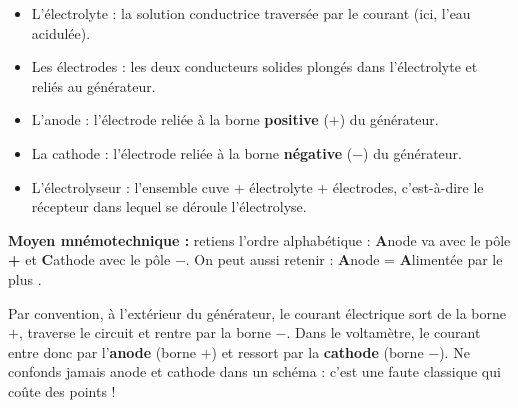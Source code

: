 \documentclass[11pt]{article}
\newcommand{\cle}[1]{{\popxbold\color{popdark}#1}}
\begin{document}
\begin{definition}
\begin{itemize}
\item L'\cle{électrolyte} : la solution conductrice traversée par le courant (ici, l'eau acidulée).
\item Les \cle{électrodes} : les deux conducteurs solides plongés dans l'électrolyte et reliés au générateur.
\item L'\cle{anode} : l'électrode reliée à la borne \textbf{positive} ($+$) du générateur.
\item La \cle{cathode} : l'électrode reliée à la borne \textbf{négative} ($-$) du générateur.
\item L'\cle{électrolyseur} : l'ensemble cuve + électrolyte + électrodes, c'est-à-dire le récepteur dans lequel se déroule l'électrolyse.
\end{itemize}
\textbf{Moyen mnémotechnique :} retiens l'ordre alphabétique : \textbf{A}node va avec le pôle \textbf{+} et \textbf{C}athode avec le pôle \textbf{$-$}. On peut aussi retenir : \og \textbf{A}node = \textbf{A}limentée par le plus \fg{}.
\end{definition}

\begin{attention}
Par convention, à l'extérieur du générateur, le courant électrique sort de la borne $+$, traverse le circuit et rentre par la borne $-$. Dans le voltamètre, le courant entre donc par l'\textbf{anode} (borne $+$) et ressort par la \textbf{cathode} (borne $-$). Ne confonds jamais anode et cathode dans un schéma : c'est une faute classique qui coûte des points !
\end{attention}
\end{document}

